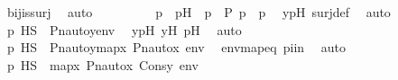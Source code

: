 \begin{isabellebody}
\ bij{\isacharunderscore}{\kern0pt}is{\isacharunderscore}{\kern0pt}surj\ \isamarkupfalse%
\ auto\isanewline
\ \ \ \ \ \ \isamarkupfalse%
\ \isamarkupfalse%
\ p{\isacharprime}{\kern0pt}\ \ p{\isacharprime}{\kern0pt}H\ {\isacharcolon}{\kern0pt}\ {\isachardoublequoteopen}p{\isacharprime}{\kern0pt}\ {\isasymin}\ P{\isachardoublequoteclose}\ {\isachardoublequoteopen}{\isasympi}{\isacharbackquote}{\kern0pt}p{\isacharprime}{\kern0pt}\ {\isacharequal}{\kern0pt}\ p{\isachardoublequoteclose}\ \isamarkupfalse%
\ ypH\ surj{\isacharunderscore}{\kern0pt}def\ \isamarkupfalse%
\ auto\isanewline
\isanewline
\ \ \ \ \ \ \isamarkupfalse%
\ \isamarkupfalse%
\ {\isachardoublequoteopen}{\isasympi}{\isacharbackquote}{\kern0pt}p{\isacharprime}{\kern0pt}\ {\isasymtturnstile}HS\ {\isasymphi}\ {\isacharbrackleft}{\kern0pt}Pn{\isacharunderscore}{\kern0pt}auto{\isacharparenleft}{\kern0pt}{\isasympi}{\isacharparenright}{\kern0pt}{\isacharbackquote}{\kern0pt}y{\isacharprime}{\kern0pt}{\isacharbrackright}{\kern0pt}{\isacharat}{\kern0pt}env{\isachardoublequoteclose}\ \isamarkupfalse%
\ ypH\ y{\isacharprime}{\kern0pt}H\ p{\isacharprime}{\kern0pt}H\ \isamarkupfalse%
\ auto\ \isanewline
\ \ \ \ \ \ \isamarkupfalse%
\ \isamarkupfalse%
\ {\isachardoublequoteopen}{\isasympi}{\isacharbackquote}{\kern0pt}p{\isacharprime}{\kern0pt}\ {\isasymtturnstile}HS\ {\isasymphi}\ {\isacharbrackleft}{\kern0pt}Pn{\isacharunderscore}{\kern0pt}auto{\isacharparenleft}{\kern0pt}{\isasympi}{\isacharparenright}{\kern0pt}{\isacharbackquote}{\kern0pt}y{\isacharprime}{\kern0pt}{\isacharbrackright}{\kern0pt}{\isacharat}{\kern0pt}map{\isacharparenleft}{\kern0pt}{\isasymlambda}x{\isachardot}{\kern0pt}\ Pn{\isacharunderscore}{\kern0pt}auto{\isacharparenleft}{\kern0pt}{\isasympi}{\isacharparenright}{\kern0pt}{\isacharbackquote}{\kern0pt}x{\isacharcomma}{\kern0pt}\ env{\isacharparenright}{\kern0pt}{\isachardoublequoteclose}\ \isamarkupfalse%
\ envmapeq\ piin\ \isamarkupfalse%
\ auto\isanewline
\ \ \ \ \ \ \isamarkupfalse%
\ \isamarkupfalse%
\ {\isachardoublequoteopen}{\isasympi}{\isacharbackquote}{\kern0pt}p{\isacharprime}{\kern0pt}\ {\isasymtturnstile}HS\ {\isasymphi}\ map{\isacharparenleft}{\kern0pt}{\isasymlambda}x{\isachardot}{\kern0pt}\ Pn{\isacharunderscore}{\kern0pt}auto{\isacharparenleft}{\kern0pt}{\isasympi}{\isacharparenright}{\kern0pt}{\isacharbackquote}{\kern0pt}x{\isacharcomma}{\kern0pt}\ Cons{\isacharparenleft}{\kern0pt}y{\isacharprime}{\kern0pt}{\isacharcomma}{\kern0pt}\ env{\isacharparenright}{\kern0pt}{\isacharparenright}{\kern0pt}{\isachardoublequoteclose}\ \isamarkupfalse%

\end{isabellebody}
